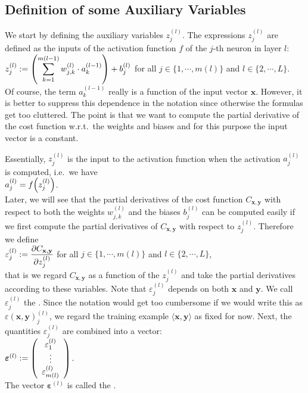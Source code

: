 \subsection{Definition of some Auxiliary Variables}
We start by defining the auxiliary variables $z_j^{(l)}$.  The expressions $z_j^{(l)}$  are defined as the
inputs of the activation function $f$ of the $j$-th neuron in layer $l$:
\\[0.2cm]
\hspace*{1.3cm}
$\displaystyle z_j^{(l)} := \left(\sum\limits_{k=1}^{m(l-1)}  w_{j,k}^{(l)} \cdot a_k^{(l-1)}\right) + b_j^{(l)}$
\quad for all  $j \in \{1, \cdots, m(l)\}$ and $l \in \{2,\cdots,L\}$.
\\[0.2cm]
Of course, the term  $a_k^{(l-1)}$ really is a function of the input vector $\mathbf{x}$.  However, it is better to suppress
this dependence in the notation since otherwise the formulas get too cluttered.  The point is that we want to
compute the partial derivative of the cost function w.r.t.~the weights and biases and for this purpose the
input vector is a constant.

Essentially, $z_j^{(l)}$ is the input to the activation function when the activation $a_j^{(l)}$ is computed,
i.e.~we have
\\[0.2cm]
\hspace*{1.3cm}
$a_j^{(l)} = f\Bigl(z_j^{(l)}\Bigr)$.
\\[0.2cm]
Later, we will see that the partial derivatives of the cost function $C_{\mathbf{x}, \mathbf{y}}$ with respect to both the weights
$w_{j,k}^{(l)}$ and the biases $b_j^{(l)}$ can be computed easily if we first compute the partial derivatives
of $C_{\mathbf{x}, \mathbf{y}}$ with respect to $z_j^{(l)}$.  Therefore we define
\\[0.2cm]
\hspace*{1.3cm}
$\displaystyle\varepsilon_j^{(l)} := \frac{\partial C_{\mathbf{x}, \mathbf{y}}}{\partial z_j^{(l)}}$ \quad for all $j \in \{1, \cdots, m(l)\}$ and $l \in \{2,\cdots, L\}$,
\\[0.2cm]
that is we regard $C_{\mathbf{x}, \mathbf{y}}$ as a function of the $z_j^{(l)}$ and take the partial
derivatives according to these variables.  
Note that $\varepsilon_j^{(l)}$ depends on both $\mathbf{x}$ and $\mathbf{y}$.  
We call  $\varepsilon_j^{(l)}$ the . 
Since the notation would
get too cumbersome if we would write this as $\varepsilon(\mathbf{x}, \mathbf{y})_j^{(l)}$, we regard the training
example $\langle\mathbf{x}, \mathbf{y}\rangle$ as fixed for now.  Next, the quantities $\varepsilon_j^{(l)}$ are combined into a vector:
\\[0.2cm]
\hspace*{1.3cm}
$\boldsymbol{\varepsilon}^{(l)} := \left(
  \begin{array}[c]{c}
    \varepsilon_1^{(l)}      \\
    \vdots             \\
    \varepsilon_{m(l)}^{(l)}  
  \end{array}
  \right)
$.
\\[0.2cm]
The vector $\boldsymbol{\varepsilon}^{(l)}$ is called the . 

